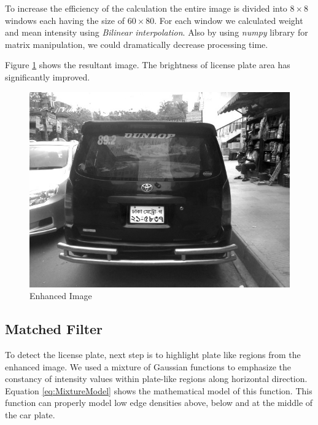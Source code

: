 \documentclass{standalone}
\begin{document}
To increase the efficiency of the calculation the entire image is divided into $8 \times 8$ windows each having the size of $60 \times 80$. For each window we calculated weight and mean intensity using {\it Bilinear interpolation}. Also by using {\it numpy} library for matrix manipulation, we could dramatically decrease processing time.

Figure \ref{fig:EnhanceSample} shows the resultant image. The brightness of license plate area has significantly improved.
\begin{figure} 
	\centering
	\includegraphics[width=.8\linewidth]{./img/sample/stage4.jpg}
	\caption{Enhanced Image} 
	\label{fig:EnhanceSample}
\end{figure}


\subsection{Matched Filter}
To detect the license plate, next step is to highlight plate like regions from the enhanced image. We used a mixture of Gaussian functions to emphasize the constancy of intensity values within plate-like regions along horizontal direction. Equation \ref{eq:MixtureModel} shows the mathematical model of this function. This function can properly model low edge densities above, below and at the middle of the car plate. 
\end{document}
